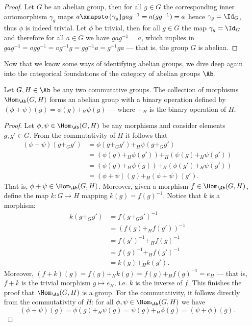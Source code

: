 \begin{proof}
Let \(G\) be an abelian group, then for all \(g \in G\) the corresponding inner
automorphism \(\gamma_g\) maps
\(a \xmapsto{\gamma_g} g a g^{-1} = a (g g^{-1}) = a\) hence
\(\gamma_g = \Id_G\), thus \(\phi\) is indeed trivial. Let \(\phi\) be trivial,
then for all \(g \in G\) the map \(\gamma_g = \Id_G\) and therefore for all
\(a \in G\) we have \(g a g^{-1} = a\), which implies in
\(g a g^{-1} = a g g^{-1} = a g^{-1} g = g g^{-1} a = g^{-1} g a\) --- that is,
the group \(G\) is abelian.
\end{proof}

Now that we know some ways of identifying abelian groups, we dive deep again
into the categorical foundations of the category of abelian groups \(\Ab\).

\begin{proposition}\label{prop: hom-ab-grp}
Let \(G, H \in \Ab\) be any two commutative groups. The collection of
morphisms \(\Hom_\Ab(G, H)\) forms an abelian group with a binary operation
defined by \((\phi + \psi)(g) = \phi(g) +_H \psi(g)\) --- where \(+_H\) is the
binary operation of \(H\).
\end{proposition}

\begin{proof}
Let \(\phi, \psi \in \Hom_\Ab(G, H)\) be any morphisms and consider elements
\(g, g' \in G\). From the commutativity of \(H\) it follows that
\begin{align*}
  (\phi + \psi)(g +_G g')
  &= \phi(g +_G g') +_H \psi(g +_G g')
  \\
  &= \left(\phi(g) +_H \phi(g')\right) +_H \left(\psi(g) +_H \psi(g')\right)
  \\
  &= \left(\phi(g) +_H \psi(g)\right) +_H \left(\phi(g') +_H \psi(g')\right)
  \\
  &= (\phi + \psi)(g) +_H (\phi + \psi)(g').
\end{align*}
That is, \(\phi + \psi \in \Hom_\Ab(G, H)\). Moreover, given a morphism
\(f \in \Hom_\Ab(G, H)\), define the map \(k: G \to H\) mapping
\(k(g) = f(g)^{-1}\). Notice that \(k\) is a morphism:
\begin{align*}
  k(g +_G g')
  &= f(g +_G g')^{-1} \\
  &= (f(g) +_H f(g'))^{-1} \\
  &= f(g')^{-1} +_H f(g)^{-1} \\
  &= f(g)^{-1} +_H f(g')^{-1} \\
  &= k(g) +_H k(g').
\end{align*}
Moreover, \((f + k)(g) = f(g) +_H k(g) = f(g) +_H f(g)^{-1} = e_H\) --- that
is, \(f + k\) is the trivial morphism \(g \mapsto e_H\), i.e. \(k\) is the
inverse of \(f\). This finishes the proof that \(\Hom_\Ab(G, H)\) is a group.
For the commutativity, it follows directly from the commutativity of \(H\):
for all \(\phi, \psi \in \Hom_\Ab(G, H)\) we have
\[
  (\phi + \psi)(g) = \phi(g) +_H \psi(g) = \psi(g) +_H \phi(g) = (\psi +
  \phi)(g).
\]
\end{proof}


